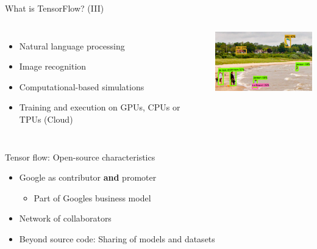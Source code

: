 \begin{frame}{What is TensorFlow? (III)}
        \begin{columns}[T]
            \vspace{1cm}
            \begin{itemize}
                \item Natural language processing
                \item Image recognition
                \item Computational-based simulations
                \item Training and execution on GPUs, CPUs or TPUs (Cloud)
            \end{itemize}
        
             \vspace{-0cm}
             \hspace*{-5cm}
             \includegraphics[width=5cm]{assets/TensorFlow_ObjectDetection(2).png}
                 \\
                 \vspace{-.1cm}
                 \hspace*{-5cm}\caption{Source: tensorflow.org}
        \end{columns}
\end{frame}

\begin{frame}{Tensor flow: Open-source characteristics}
    \begin{itemize}
        \item Google as contributor \textbf{and} promoter
        \begin{itemize}
        \item Part of Googles business model
        \end{itemize}
        \item Network of collaborators 
        \item Beyond source code: Sharing of models and datasets
    \end{itemize}
\end{frame}

